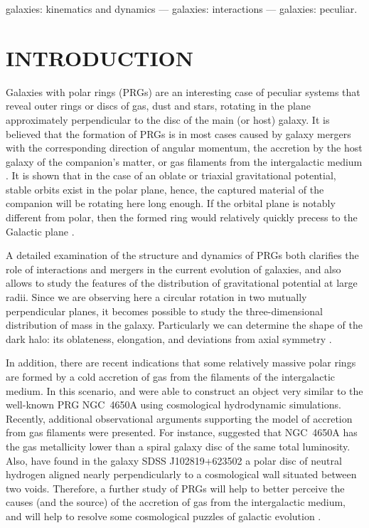 \documentclass[useAMS,usenatbib]{mn2e}
\begin{document}
\begin{keywords}
galaxies: kinematics and dynamics --- galaxies: interactions --- galaxies: peculiar.
\end{keywords}


\section{INTRODUCTION}

Galaxies with polar rings (PRGs) are an interesting case of
peculiar systems that reveal outer rings or discs of gas, dust and
stars, rotating in the plane approximately perpendicular to the
disc of the main (or host) galaxy. It is believed that the
formation of PRGs is in most cases caused by galaxy mergers with
the corresponding direction of angular momentum, the accretion by
the host galaxy of the companion's matter, or gas filaments from
the intergalactic medium  \citep[see references in the review by ][]{Combes06}.
It is shown
that in the case of an oblate or triaxial gravitational potential,
stable orbits exist in the polar plane, hence, the captured
material of the companion will be rotating here long enough. If
the orbital plane is notably different from polar, then the formed
ring would relatively quickly precess to the Galactic plane
\citep{Steiman1982}.

A detailed examination of the structure and dynamics of PRGs both
clarifies the role of interactions and mergers in the current
evolution of galaxies, and also allows to study the features of
the distribution of gravitational potential at large radii. Since
we are observing here a circular rotation in two mutually
perpendicular planes, it becomes possible to study the
three-dimensional distribution of mass in the galaxy. Particularly
we can determine the shape of the dark halo: its oblateness,
elongation, and deviations from axial symmetry
\citep{SackettPogge1995,Iodice03,Combes06}.

In addition, there are
recent indications that some relatively massive polar rings are
formed by a cold accretion of gas from the filaments of the intergalactic medium.
In this scenario, \citet*{Maccio2006} and \citet{Brook2008} were able to construct
an object very similar to the well-known PRG NGC~4650A using
cosmological hydrodynamic simulations. Recently, additional
observational arguments supporting the model of accretion from gas
filaments were presented.  For instance, \citet{Spavone2010}
suggested that NGC~4650A has the gas metallicity lower than a spiral galaxy disc of the same total luminosity.
Also, \citet{Stanonik2009} have found in the galaxy SDSS J102819+623502
a polar disc of neutral hydrogen aligned nearly perpendicularly to a cosmological wall situated
between two voids. Therefore, a further study of PRGs will help to better perceive the causes
(and the source) of the accretion of gas from the intergalactic
medium, and will help to resolve some cosmological puzzles
of galactic evolution \citep*{Combes2008}.%
\end{document}
